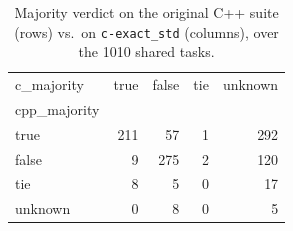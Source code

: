 \begin{table}[t]
  \centering
  \caption{Majority verdict on the original C++ suite (rows) vs.\ on \texttt{c-exact_std} (columns), over the 1010 shared tasks.}
  \label{tab:dual-majority-c-exact_std}
\begin{tabular}{lrrrr}
\toprule
c_majority & true & false & tie & unknown \\
cpp_majority &  &  &  &  \\
\midrule
true & 211 & 57 & 1 & 292 \\
false & 9 & 275 & 2 & 120 \\
tie & 8 & 5 & 0 & 17 \\
unknown & 0 & 8 & 0 & 5 \\
\bottomrule
\end{tabular}
\end{table}
